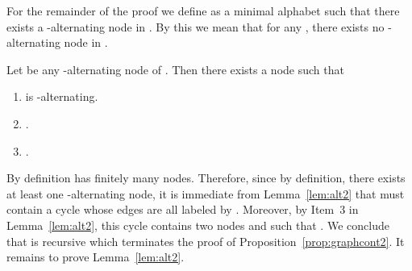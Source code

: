 \documentclass[envcountsame]{llncs}
\begin{document}
For the remainder of the proof we define  as a minimal alphabet
such that there exists a -alternating node in . By this
we mean that for any , there exists no
-alternating node in .

\begin{lemma} \label{lem:alt2}
  Let  be any -alternating node of . Then
  there exists a node  such that

  \begin{enumerate}
  \item  is -alternating.
  \item .
  \item .
  \end{enumerate}
\end{lemma}

By definition  has finitely many nodes. Therefore, since by
definition, there exists at least one -alternating node, it is
immediate from Lemma~\ref{lem:alt2} that  must contain a
cycle whose edges are all labeled by . Moreover, by Item~3 in
Lemma~\ref{lem:alt2}, this cycle contains two nodes  and
 such that . We conclude that  is
recursive which terminates the proof of
Proposition~\ref{prop:graphcont2}. It remains to prove Lemma~\ref{lem:alt2}.  
\end{document}
